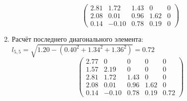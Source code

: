 \begin{multicols}{3}
\begin{enumerate}
$$\begin{pmatrix}
        2.81 & 1.72  & 1.43 & 0    & 0 \\
        2.08 & 0.01  & 0.96 & 1.62 & 0 \\
        0.14 & -0.10 & 0.78 & 0.19 & 0
    \end{pmatrix}$$
    \vspace{-0.5cm}
    \item Расчёт последнего диагонального элемента: $l_{5,5} = \sqrt{1.20 - (0.40^2+1.34^2+1.36^2)} = 0.72$
    $$\begin{pmatrix}
        2.77 & 0     & 0    & 0    & 0    \\
        1.57 & 2.19  & 0    & 0    & 0    \\
        2.81 & 1.72  & 1.43 & 0    & 0    \\
        2.08 & 0.01  & 0.96 & 1.62 & 0    \\
        0.14 & -0.10 & 0.78 & 0.19 & 0.72
    \end{pmatrix}$$
    \end{enumerate}



\end{multicols}
